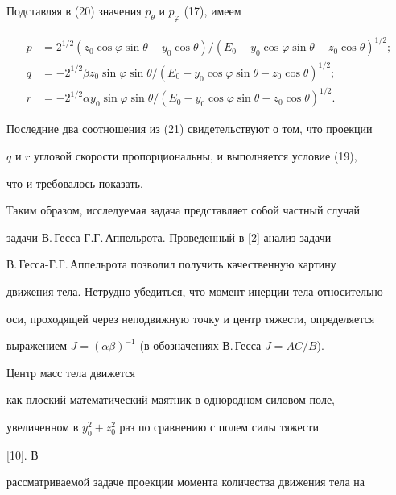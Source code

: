 Подставляя в (20) значения $p_\theta$ и $p_\varphi$ (17), имеем


\begin{equation}


\begin{split}


p&=2^{1/2}(z_0\cos\varphi\sin\theta-y_0\cos\theta)/


(E_0-y_0\cos\varphi\sin\theta-z_0\cos\theta)^{1/2};\\


q&=-2^{1/2}\beta z_0\sin\varphi\sin\theta/(E_0-y_0


\cos\varphi\sin\theta-z_0\cos\theta)^{1/2};\\


r&=-2^{1/2}\alpha y_0\sin\varphi\sin\theta/


(E_0-y_0\cos\varphi\sin\theta-z_0\cos\theta)^{1/2}.


\end{split}


\end{equation}


Последние два соотношения из (21) свидетельствуют о том, что проекции


$q$ и $r$ угловой скорости пропорциональны, и выполняется условие (19),


что и требовалось показать.





Таким образом, исследуемая задача представляет собой частный случай


задачи В.\,Гесса-Г.Г.\,Аппельрота. Проведенный в [2] анализ задачи


В.\,Гесса-Г.Г.\,Аппельрота позволил получить качественную картину


движения тела. Нетрудно убедиться, что момент инерции тела относительно


оси, проходящей через неподвижную точку и центр тяжести, определяется


выражением $J=(\alpha\beta)^{-1}$ (в обозначениях В.\,Гесса $J=AC/B$).


Центр масс тела движется


как плоский математический маятник в однородном силовом поле,


увеличенном в $y^2_0+z^2_0$ раз по сравнению с полем силы тяжести


[10]. В


рассматриваемой задаче проекции момента количества движения тела на


